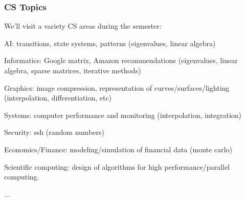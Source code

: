 \documentclass[10pt]{beamer}
\begin{document}
\begin{frame}
\frametitle{CS Topics}
We'll visit a variety CS areas during the semester:
\begin{description}
\item AI:  transitions, state systems, patterns (eigenvalues, linear algebra)
\item Informatics:  Google matrix, Amazon recommendations (eigenvalues, linear
algebra, sparse matrices, iterative methods)
\item Graphics:  image compression, representation of
curves/surfaces/lighting (interpolation, differentiation, etc)
\item Systems:  computer performance and monitoring (interpolation, integration)
\item Security:  ssh (random numbers)
\item Economics/Finance:  modeling/simulation of financial data (monte carlo)
\item Scientific computing:  design of algorithms for high performance/parallel computing.
\item ... 
\end{description}
\end{frame}
\end{document}
